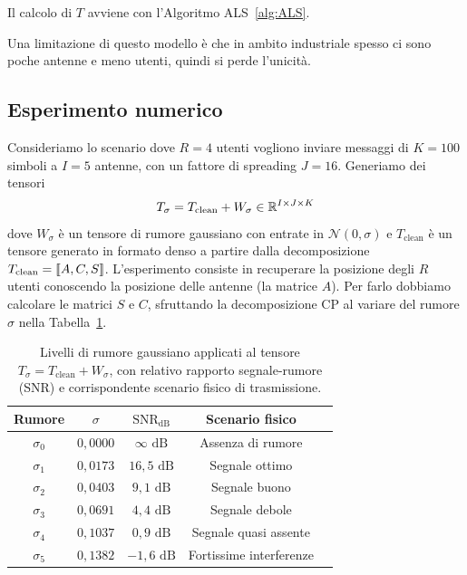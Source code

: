Il calcolo di $ T $ avviene con l'Algoritmo ALS~\ref{alg:ALS}.

\begin{remark}
	Una limitazione di questo modello è che in ambito industriale spesso ci sono poche antenne e meno
	utenti, quindi si perde l'unicità.
\end{remark}

\subsection*{Esperimento numerico}
\label{sec:num_experiment_omini}

Consideriamo lo scenario dove $ R = 4 $ utenti vogliono inviare messaggi di $ K = 100 $ simboli a $
	I = 5 $ antenne, con un fattore di spreading $ J = 16 $.
Generiamo dei tensori
\begin{equation*}
	T_{\sigma} = T_{\text{clean}} + W_{\sigma} \in \mathbb{R}^{I\times J\times K}
\end{equation*}
dove $ W_{\sigma} $ è un tensore di rumore gaussiano con entrate in $ \mathcal{N}(0, \sigma) $ e $
	T_{\text{clean}} $ è un tensore generato in formato denso a partire dalla decomposizione $
	T_{\text{clean}} = \dsqr{A,C,S}$. L'esperimento consiste in recuperare la posizione degli $ R $
utenti conoscendo la posizione delle antenne (la matrice $ A $). Per farlo dobbiamo calcolare le
matrici $ S $ e $ C $, sfruttando la decomposizione CP al variare del rumore $ \sigma $ nella
Tabella~\ref{tab:dscdma_noise_scale}.

\begin{table}[htbp]
	\centering
	\caption{Livelli di rumore gaussiano applicati al tensore $T_{\sigma} = T_{\text{clean}} + W_{\sigma}$, con relativo rapporto segnale-rumore (SNR) e corrispondente scenario fisico di trasmissione.}
	\label{tab:dscdma_noise_scale}
	\begin{tabular}{c c c c l}
		\toprule
		Rumore     & $\sigma$   & $\text{SNR}_{\text{dB}}$ & Scenario fisico       \\
		\midrule
		$\sigma_0$ & $0{,}0000$ & $\infty\text{ dB}$       & Assenza di rumore     \\
		$\sigma_1$ & $0{,}0173$ & $16{,}5\text{ dB}$       & Segnale ottimo        \\
		$\sigma_2$ & $0{,}0403$ & $9{,}1\text{ dB}$        & Segnale buono         \\
		$\sigma_3$ & $0{,}0691$ & $4{,}4\text{ dB}$        & Segnale debole        \\
		$\sigma_4$ & $0{,}1037$ & $0{,}9\text{ dB}$        & Segnale quasi assente \\
		$\sigma_5$ & $0{,}1382$ & $-1{,}6\text{ dB}$       & Fortissime
		interferenze                                                               \\
		\bottomrule
	\end{tabular}
\end{table}


